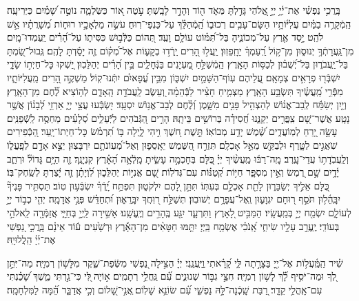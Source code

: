 \documentclass[twoside, openany, parskip=half, 11pt]{book}
\begin{document}
בָּֽרֲכִ֥י נַפְשִׁ֗י אֶת־יְ֫יָ֥ יְיָ֣ אֱ֭לֹהַי גָּדַ֣לְתָּ מְּאֹ֑ד ה֖וֹד וְהָדָ֣ר לָבָֽשְׁתָּ׃ עֹ֣טֶה א֭וֹר כַּשַּׂלְמָ֑ה נוֹטֶ֣ה שָׁ֝מַ֗יִם כַּיְּרִיעָֽה׃ הַֽמְֿקָרֶ֥ה בַמַּ֗יִם עֲלִיּ֫וֹתָ֥יו הַשָּׂם־עָבִ֥ים רְכוּב֑וֹ הַֽ֝מְֿהַלֵּ֗ךְ עַל־כַּנְפֵי־רֽוּחַ׃ עֹשֶׂ֣ה מַלְאָכָ֣יו רוּח֑וֹת מְ֝שָׁרֲתָ֗יו אֵ֣שׁ לֹהֵֽט׃ יָ֣סַד אֶ֖רֶץ עַל־מְכוֹנֶ֑יהָ בַּל־תִּ֝מּ֗וֹט עוֹלָ֥ם וָעֶֽד׃ תְּ֭הוֹם כַּלְּֿב֣וּשׁ כִּסִּית֑וֹ עַל־הָ֝רִ֗ים יַֽעַמְדוּ־מָֽיִם׃ מִן־גַּֽעֲרָתְֿךָ֥ יְנוּס֑וּן מִן־ק֥וֹל רַֽ֝עַמְךָ֗ יֵחָֽפֵזֽוּן׃ יַֽעֲל֣וּ הָ֭רִים יֵֽרְֿד֣וּ בְקָע֑וֹת אֶל־מְ֝ק֗וֹם זֶ֤ה יָסַ֬דְתָּ לָהֶֽם׃ גְּֽבוּל־שַׂ֭מְתָּ בַּל־יַֽעֲבֹר֑וּן בַּל־יְ֝שֻׁב֗וּן לְכַסּ֥וֹת הָאָֽרֶץ׃ הַֽמְֿשַׁלֵּ֣חַ מַ֭עְיָנִים בַּנְּֿחָלִ֑ים בֵּ֥ין הָ֝רִ֗ים יְהַלֵּכֽוּן׃ יַ֭שְׁקוּ כָּל־חַיְת֣וֹ שָׂדָ֑י יִשְׁבְּֿר֖וּ פְרָאִ֣ים צְמָאָֽם׃ עֲ֭לֵיהֶם עֽוֹף־הַשָּׁמַ֣יִם יִשְׁכּ֑וֹן מִבֵּ֥ין עֳ֝פָאיִ֗ם יִתְּֿנוּ־קֽוֹל׃ מַשְׁקֶ֣ה הָ֭רִים מֵֽעֲלִיּוֹתָ֑יו מִפְּֿרִ֥י מַֽ֝עֲשֶׂ֗יךָ תִּשְׂבַּ֥ע הָאָֽרֶץ׃ מַצְמִ֤יחַ חָצִ֨יר לַבְּֿהֵמָ֗ה וְ֭עֵשֶׂב לַֽעֲבֹדַ֣ת הָֽאָדָ֑ם לְה֥וֹצִיא לֶ֝֗חֶם מִן־הָאָֽרֶץ׃ וְיַ֤יִן יְשַׂמַּ֬ח לְֽבַב־אֱנ֗וֹשׁ לְהַצְהִ֣יל פָּנִ֣ים מִשָּׁ֑מֶן וְ֝לֶ֗חֶם לְבַב־אֱנ֥וֹשׁ יִסְעָֽד׃ יִ֭שְׂבְּֿעוּ עֲצֵ֣י יְיָ֑ אַרְזֵ֥י לְ֝בָנ֗וֹן אֲשֶׁ֣ר נָטָֽע׃ אֲשֶׁר־שָׁ֭ם צִֽפֳּרִ֣ים יְקַנֵּ֑נוּ חֲ֝סִידָ֗ה בְּרוֹשִׁ֥ים בֵּיתָֽהּ׃ הָרִ֣ים הַ֭גְּֿבֹהִים לַיְּֿעֵלִ֑ים סְ֝לָעִ֗ים מַחְסֶ֥ה לַֽשְֿׁפַנִּֽים׃ עָשָׂ֣ה יָ֭רֵחַ לְמֽוֹעֲדִ֑ים שֶׁ֝֗מֶשׁ יָדַ֥ע מְבוֹאֽוֹ׃ תָּ֣שֶׁת ח֭שֶׁךְ וִ֣יהִי לָ֑יְלָה בּ֥וֹ תִ֝רְמֹ֗שׂ כָּל־חַיְתוֹ־יָֽעַר׃ הַ֭כְּֿפִירִים שֹֽׁאֲגִ֣ים לַטָּ֑רֶף וּלְבַקֵּ֖שׁ מֵאֵ֣ל אָכְלָֽם׃ תִּזְרַ֣ח הַ֭שֶּׁמֶשׁ יֵאָֽסֵפ֑וּן וְאֶל־מְ֝עֽוֹנֹתָ֥ם יִרְבָּצֽוּן׃ יֵצֵ֣א אָדָ֣ם לְפָֽעֳל֑וֹ וְלַֽעֲבֹֽדָת֥וֹ עֲדֵי־עָֽרֶב׃ מָֽה־רַבּ֬וּ מַֽעֲשֶׂ֨יךָ יְיָ֗ כֻּ֭לָּם בְּחָכְמָ֣ה עָשִׂ֑יתָ מָֽלְֿאָ֥ה הָ֝אָ֗רֶץ קִנְיָנֶֽךָ׃ זֶ֤ה הַיָּ֥ם גָּדוֹל֘ וּרְחַ֢ב יָ֫דָ֥יִם שָׁ֣ם רֶ֭מֶשׂ וְאֵ֣ין מִסְפָּ֑ר חַיּ֥וֹת קְ֝טַנּ֗וֹת עִם־גְּדֹלֽוֹת׃ שָׁ֭ם אֳנִיּ֣וֹת יְהַלֵּכ֑וּן לִ֝וְיָתָ֗ן זֶ֤ה יָ֬צַרְתָּ לְשַֽׂחֶק־בּֽוֹ׃ כֻּ֭לָּם אֵלֶ֣יךָ יְשַׂבֵּר֑וּן לָתֵ֖ת אָכְלָ֣ם בְּעִתּֽוֹ׃ תִּתֵּ֣ן לָ֭הֶם יִלְקֹט֑וּן תִּפְתַּ֥ח יָֽ֝דְֿךָ֗ יִשְׂבְּֿע֥וּן טֽוֹב׃ תַּסְתִּ֥יר פָּנֶיךָ֘ יִבָּֽהֵ֫ל֥וּן תֹּסֵ֣ף ר֭וּחָם יִגְוָע֑וּן וְֽאֶל־עֲפָרָ֥ם יְשׁוּבֽוּן׃ תְּשַׁלַּ֣ח ר֭וּֽחֲךָ יִבָּֽרֵא֑וּן וּ֝תְחַדֵּ֗שׁ פְּנֵ֣י אֲדָמָֽה׃ יְהִ֤י כְב֣וֹד יְיָ֣ לְעוֹלָ֑ם יִשְׂמַ֖ח יְיָ֣ בְּמַֽעֲשָֽׂיו׃ הַמַּבִּ֣יט לָ֭אָרֶץ וַתִּרְעָ֑ד יִגַּ֖ע בֶּֽהָרִ֣ים וְיֶֽעֱשָֽׁנוּ׃ אָשִׁ֣ירָה לַּֽיְיָ֣ בְּחַיָּ֑י אֲזַמְּֿרָ֖ה לֵֽאלֹהַ֣י בְּעוֹדִֽי׃ יֶֽעֱרַ֣ב עָלָ֣יו שִׂיחִ֑י אָֽ֝נֹכִ֗י אֶשְׂמַ֥ח בַּֽיְיָ׃ יִתַּ֤מּוּ חַטָּאִ֨ים מִן־הָאָ֡רֶץ וּרְשָׁ֙עִים ע֬וֹד אֵינָ֗ם בָּֽרֲכִ֣י נַ֭פְשִׁי אֶת־יְ֜יָ֗ הַֽלֲלוּיָֽהּ׃
 
שִׁ֗יר הַֽמַּֽ֫עֲל֥וֹת אֶל־יְ֖יָ בַּצָּרָ֣תָה לִּ֑י קָ֝רָ֗אתִי ֽוַיַּֽעֲנֵֽנִי׃ יְיָ֗ הַצִּ֣ילָה נַ֭פְשִׁי מִשְּֿׂפַת־שֶׁ֑קֶר מִלָּשׁ֥וֹן רְמִיָּֽה׃ מַה־יִּתֵּ֣ן לְ֭ךָ וּמַה־יֹּסִ֥יף לָ֝֗ךְ לָשׁ֥וֹן רְמִיָּֽה׃ חִצֵּ֣י גִבּ֣וֹר שְׁנוּנִ֑ים עִ֝֗ם גַּֽחֲלֵ֥י רְתָמִֽים׃ א֣וֹיָה ֖לִּי כִּי־גַ֣רְתִּי מֶ֑שֶׁךְ שָׁ֝כַ֗נְתִּי עִם־אָֽהֳלֵ֥י קֵדָֽר׃ רַ֭בַּת שָֽׁכְֿנָה־לָּ֣הּ נַפְשִׁ֑י עִ֝֗ם שׂוֹנֵ֥א שָׁלֽוֹם׃ ֽאֲנִ֣י־שָׁ֭לוֹם וְכִ֣י אֲדַבֵּ֑ר הֵ֝֗מָּה לַמִּלְחָמָֽה׃
\end{document}
